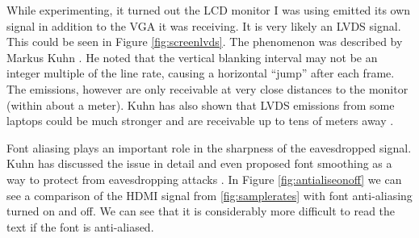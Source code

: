\documentclass[a4paper,12pt,twoside,openright]{report}
\begin{document}
While experimenting, it turned out the LCD monitor I was using emitted its own signal in addition to the VGA it was receiving. It is very likely an LVDS signal. This could be seen in Figure \ref{fig:screenlvds}. The phenomenon was described by Markus Kuhn \cite{kuhn2011compromising}. He noted that the vertical blanking interval may not be an integer multiple of the line rate, causing a horizontal ``jump'' after each frame. The emissions, however are only receivable at very close distances to the monitor (within about a meter). Kuhn has also shown that LVDS emissions from some laptops could be much stronger and are receivable up to tens of meters away \cite{kuhn2003compromising}. 

Font aliasing plays an important role in the sharpness of the eavesdropped signal. Kuhn has discussed the issue in detail and even proposed font smoothing as a way to protect from eavesdropping attacks \cite{kuhn2003compromising}. In Figure \ref{fig:antialiseonoff} we can see a comparison of the HDMI signal from \ref{fig:samplerates} with font anti-aliasing turned on and off. We can see that it is considerably more difficult to read the text if the font is anti-aliased.
\end{document}
